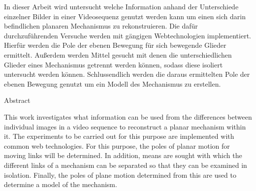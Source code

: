 %
\label{sec:abstract}

In dieser Arbeit wird untersucht welche Information anhand der Unterschiede einzelner Bilder in einer Videosequenz genutzt werden kann um einen sich darin befindlichen planaren Mechanismus zu rekonstruieren.
Die dafür durchzuführenden Versuche werden mit gängigen Webtechnologien implementiert.
Hierfür werden die Pole der ebenen Bewegung für sich bewegende Glieder ermittelt.
Au{\ss}erdem werden Mittel gesucht mit denen die unterschiedlichen Glieder eines Mechanismus getrennt werden können, sodass diese isoliert untersucht werden können.
Schlussendlich werden die daraus ermittelten Pole der ebenen Bewegung genutzt um ein Modell des Mechanismus zu erstellen.

\vspace*{20mm}

{Abstract}
\label{sec:abstract-diff}

This work investigates what information can be used from the differences between individual images in a video sequence to reconstruct a planar mechanism within it.
The experiments to be carried out for this purpose are implemented with common web technologies.
For this purpose, the poles of planar motion for moving links will be determined.
In addition, means are sought with which the different links of a mechanism can be separated so that they can be examined in isolation.
Finally, the poles of plane motion determined from this are used to determine a model of the mechanism.
